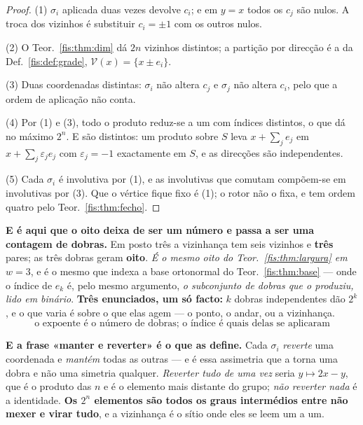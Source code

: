 \documentclass[livro.tex]{subfiles}
\begin{document}
\begin{proof}
(1) $\sigma_i$ aplicada duas vezes devolve $c_i$; e em $y=x$ todos os $c_j$ são
nulos. A troca dos vizinhos é substituir $c_i=\pm1$ com os outros nulos.

(2) O Teor.~\ref{fis:thm:dim} dá $2n$ vizinhos distintos; a partição por
direcção é a da Def.~\ref{fis:def:grade}, $\mathcal V(x)=\{x\pm e_i\}$.

(3) Duas coordenadas distintas: $\sigma_i$ não altera $c_j$ e $\sigma_j$ não
altera $c_i$, pelo que a ordem de aplicação não conta.

(4) Por (1) e (3), todo o produto reduz-se a um com índices distintos, o que dá
no máximo $2^{n}$. E são distintos: um produto sobre $S$ leva $x+\sum_j e_j$ em
$x+\sum_j\varepsilon_j e_j$ com $\varepsilon_j=-1$ exactamente em $S$, e as
direcções são independentes.

(5) Cada $\sigma_i$ é involutiva por (1), e as involutivas que comutam compõem-se
em involutivas por (3). Que o vértice fique fixo é (1); o rotor não o fixa, e
tem ordem quatro pelo Teor.~\ref{fis:thm:fecho}.
\end{proof}


\medskip\noindent\textbf{E é aqui que o oito deixa de ser um número e passa a
ser uma contagem de dobras.} Em posto três a vizinhança tem seis vizinhos e
\textbf{três} pares; as três dobras geram \textbf{oito}. \emph{É o mesmo oito do
Teor.~\ref{fis:thm:largura} em $w=3$}, e é o mesmo que indexa a base ortonormal
do Teor.~\ref{fis:thm:base} --- onde o índice de $e_k$ é, pelo mesmo argumento,
\emph{o subconjunto de dobras que o produziu, lido em binário}. \textbf{Três
enunciados, um só facto:} $k$ dobras independentes dão $2^{k}$, e o que varia é
sobre o que elas agem --- o ponto, o andar, ou a vizinhança.
\[
\boxed{\;\text{o expoente é o número de dobras; o índice é quais delas se aplicaram}\;}
\]

\medskip\noindent\textbf{E a frase «manter e reverter» é o que as define.} Cada
$\sigma_i$ \emph{reverte} uma coordenada e \emph{mantém} todas as outras --- e é
essa assimetria que a torna uma dobra e não uma simetria qualquer. \emph{Reverter
tudo de uma vez} seria $y\mapsto2x-y$, que é o produto das $n$ e é o elemento
mais distante do grupo; \emph{não reverter nada} é a identidade. \textbf{Os
$2^{n}$ elementos são todos os graus intermédios entre não mexer e virar tudo}, e
a vizinhança é o sítio onde eles se leem um a um.
\end{document}

